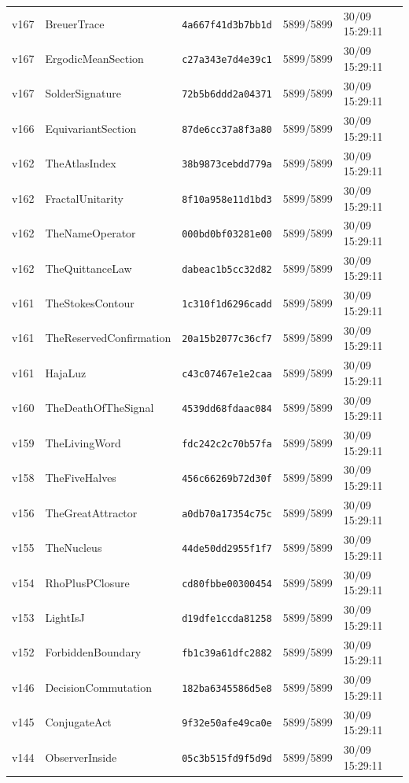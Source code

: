\documentclass[11pt]{article}
\theoremstyle{definition}\newtheorem{deriv}{Derivação}
\begin{document}
{\begin{longtable}{@{}lllll@{}}
v167 & BreuerTrace & \texttt{4a667f41d3b7bb1d} & 5899/5899 & 30/09 15:29:11 \\
v167 & ErgodicMeanSection & \texttt{c27a343e7d4e39c1} & 5899/5899 & 30/09 15:29:11 \\
v167 & SolderSignature & \texttt{72b5b6ddd2a04371} & 5899/5899 & 30/09 15:29:11 \\
v166 & EquivariantSection & \texttt{87de6cc37a8f3a80} & 5899/5899 & 30/09 15:29:11 \\
v162 & TheAtlasIndex & \texttt{38b9873cebdd779a} & 5899/5899 & 30/09 15:29:11 \\
v162 & FractalUnitarity & \texttt{8f10a958e11d1bd3} & 5899/5899 & 30/09 15:29:11 \\
v162 & TheNameOperator & \texttt{000bd0bf03281e00} & 5899/5899 & 30/09 15:29:11 \\
v162 & TheQuittanceLaw & \texttt{dabeac1b5cc32d82} & 5899/5899 & 30/09 15:29:11 \\
v161 & TheStokesContour & \texttt{1c310f1d6296cadd} & 5899/5899 & 30/09 15:29:11 \\
v161 & TheReservedConfirmation & \texttt{20a15b2077c36cf7} & 5899/5899 & 30/09 15:29:11 \\
v161 & HajaLuz & \texttt{c43c07467e1e2caa} & 5899/5899 & 30/09 15:29:11 \\
v160 & TheDeathOfTheSignal & \texttt{4539dd68fdaac084} & 5899/5899 & 30/09 15:29:11 \\
v159 & TheLivingWord & \texttt{fdc242c2c70b57fa} & 5899/5899 & 30/09 15:29:11 \\
v158 & TheFiveHalves & \texttt{456c66269b72d30f} & 5899/5899 & 30/09 15:29:11 \\
v156 & TheGreatAttractor & \texttt{a0db70a17354c75c} & 5899/5899 & 30/09 15:29:11 \\
v155 & TheNucleus & \texttt{44de50dd2955f1f7} & 5899/5899 & 30/09 15:29:11 \\
v154 & RhoPlusPClosure & \texttt{cd80fbbe00300454} & 5899/5899 & 30/09 15:29:11 \\
v153 & LightIsJ & \texttt{d19dfe1ccda81258} & 5899/5899 & 30/09 15:29:11 \\
v152 & ForbiddenBoundary & \texttt{fb1c39a61dfc2882} & 5899/5899 & 30/09 15:29:11 \\
v146 & DecisionCommutation & \texttt{182ba6345586d5e8} & 5899/5899 & 30/09 15:29:11 \\
v145 & ConjugateAct & \texttt{9f32e50afe49ca0e} & 5899/5899 & 30/09 15:29:11 \\
v144 & ObserverInside & \texttt{05c3b515fd9f5d9d} & 5899/5899 & 30/09 15:29:11 \\

\end{longtable}}
\end{document}
